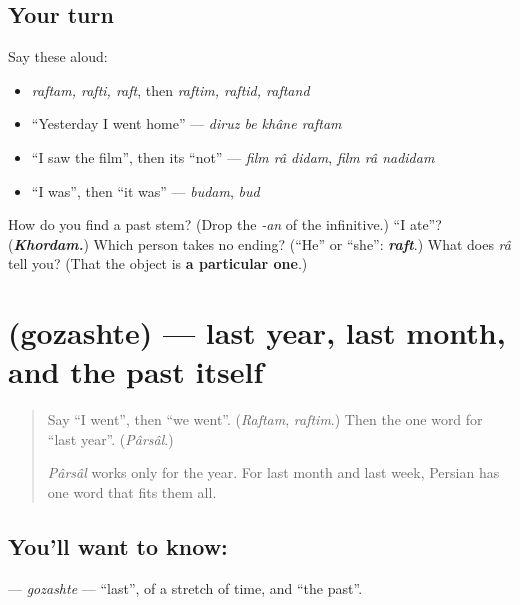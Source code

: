 \subsection*{Your turn}
Say these aloud:

\begin{itemize}
\raggedright
  \item \emph{raftam, rafti, raft}, then \emph{raftim, raftid, raftand}
  \item \textquotedblleft{}Yesterday I went home\textquotedblright{} — \emph{diruz be khâne raftam}
  \item \textquotedblleft{}I saw the film\textquotedblright{}, then its \textquotedblleft{}not\textquotedblright{} — \emph{film râ didam}, \emph{film râ nadidam}
  \item \textquotedblleft{}I was\textquotedblright{}, then \textquotedblleft{}it was\textquotedblright{} — \emph{budam}, \emph{bud}
\end{itemize}

\begin{tcolorbox}[breakable,colback=teal!4,colframe=teal!35!black,title={Before you move on}]
How do you find a past stem? (Drop the \emph{-an} of the infinitive.) \textquotedblleft{}I ate\textquotedblright{}? (\emph{\textbf{Khordam.}}) Which person takes no ending? (\textquotedblleft{}He\textquotedblright{} or \textquotedblleft{}she\textquotedblright{}: \emph{\textbf{raft}}.) What does \emph{râ} tell you? (That the object is \textbf{a particular one}.)
\end{tcolorbox}
\section[\texorpdfstring{\fa{گذشته} (gozashte)}{گذشته (gozashte)}]{ (gozashte) — last year, last month, and the past itself}

\label{lesson:FA-C290-gozashte}



\begin{quote}
Say \textquotedblleft{}I went\textquotedblright{}, then \textquotedblleft{}we went\textquotedblright{}. (\emph{Raftam}, \emph{raftim}.) Then the one word for \textquotedblleft{}last year\textquotedblright{}. (\emph{Pârsâl}.)

\emph{Pârsâl} works only for the year. For last month and last week, Persian has one word that fits them all.
\end{quote}

\subsection*{You'll want to know: }
\textbf{} — \emph{gozashte} — \textquotedblleft{}last\textquotedblright{}, of a stretch of time, and \textquotedblleft{}the past\textquotedblright{}.

